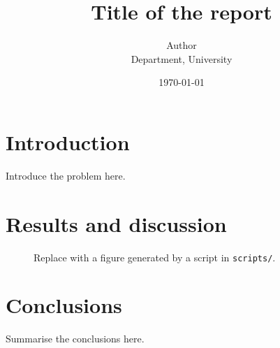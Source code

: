 \documentclass[11pt]{report}
\title{Title of the report}
\author{Author\\ \small Department, University}
\date{\today}
\begin{document}
\maketitle
\tableofcontents

\chapter{Introduction}

Introduce the problem here.

\chapter{Results and discussion}

\begin{figure}[htbp]
  \centering
  \caption{Replace with a figure generated by a script in \texttt{scripts/}.}
  \label{fig:example}
\end{figure}

\chapter{Conclusions}

Summarise the conclusions here.



\end{document}
